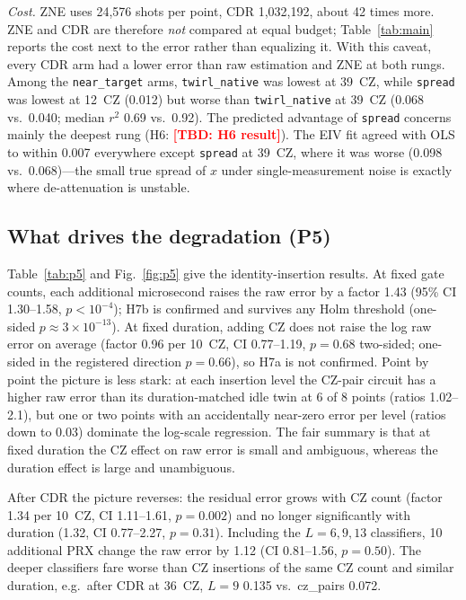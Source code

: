 \documentclass[conference]{IEEEtran}
\newcommand{\TBD}[1]{\textcolor{red}{\textbf{[TBD: #1]}}}
\newcommand{\arm}[1]{\texttt{#1}}
\begin{document}
\emph{Cost.} ZNE uses 24,576 shots per point, CDR 1,032,192, about 42 times more. ZNE and CDR are
therefore \emph{not} compared at equal budget; Table~\ref{tab:main} reports the cost next to the
error rather than equalizing it. With this caveat, every CDR arm had a lower error than raw estimation
and ZNE at both rungs. Among the \arm{near\_target} arms, \arm{twirl\_native} was lowest at 39~CZ,
while \arm{spread} was lowest at 12~CZ (0.012) but worse than \arm{twirl\_native} at 39~CZ (0.068 vs.\ 0.040; median $r^2$ 0.69 vs.\ 0.92). The
predicted advantage of \arm{spread} concerns mainly the deepest rung (H6: \TBD{H6 result}). The
EIV fit agreed with OLS to within 0.007 everywhere except \arm{spread} at 39~CZ, where it was
worse (0.098 vs.\ 0.068)---the small true spread of $x$ under single-measurement noise is exactly
where de-attenuation is unstable.

\subsection{What drives the degradation (P5)}
Table~\ref{tab:p5} and Fig.~\ref{fig:p5} give the identity-insertion results. At fixed gate
counts, each additional microsecond raises the raw error by a factor 1.43 (95\% CI 1.30--1.58,
$p<10^{-4}$); H7b is confirmed and survives any Holm threshold (one-sided $p\approx3\times10^{-13}$).
At fixed duration, adding CZ does not raise the log raw error on average (factor 0.96 per
10~CZ, CI 0.77--1.19, $p=0.68$ two-sided; one-sided in the registered direction $p=0.66$), so
H7a is not confirmed. Point by point the picture is less stark: at each insertion level the
CZ-pair circuit has a higher raw error than its duration-matched idle twin at 6 of 8 points
(ratios 1.02--2.1), but one or two points with an accidentally near-zero error per level
(ratios down to 0.03) dominate the log-scale regression. The fair summary is that at fixed
duration the CZ effect on raw error is small and ambiguous, whereas the duration effect is
large and unambiguous.

After CDR the picture reverses: the residual error grows with CZ count (factor 1.34 per 10~CZ,
CI 1.11--1.61, $p=0.002$) and no longer significantly with duration (1.32, CI 0.77--2.27,
$p=0.31$). Including the $L=6,9,13$ classifiers, 10 additional PRX change the raw error by
1.12 (CI 0.81--1.56, $p=0.50$). The deeper classifiers fare worse than CZ insertions of the same
CZ count and similar duration, e.g.\ after CDR at 36~CZ, $L=9$ 0.135 vs.\ cz\_pairs 0.072.
\end{document}
